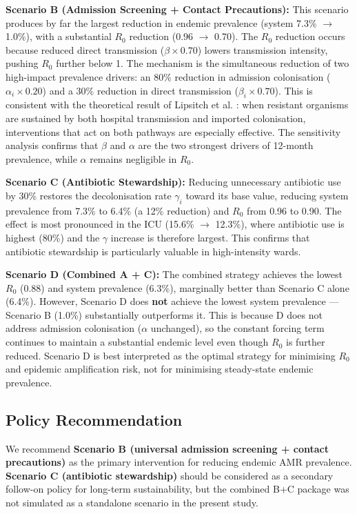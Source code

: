 \documentclass[12pt,a4paper]{article}
\begin{document}
\textbf{Scenario B (Admission Screening + Contact Precautions):} This scenario produces by far the largest reduction in endemic prevalence (system 7.3\% $\to$ 1.0\%), with a substantial $R_0$ reduction (0.96 $\to$ 0.70). The $R_0$ reduction occurs because reduced direct transmission ($\beta \times 0.70$) lowers transmission intensity, pushing $R_0$ further below 1. The mechanism is the simultaneous reduction of two high-impact prevalence drivers: an 80\% reduction in admission colonisation ($\alpha_i \times 0.20$) and a 30\% reduction in direct transmission ($\beta_i \times 0.70$). This is consistent with the theoretical result of Lipsitch et al. \cite{lipsitch2000}: when resistant organisms are sustained by both hospital transmission and imported colonisation, interventions that act on both pathways are especially effective. The sensitivity analysis confirms that $\beta$ and $\alpha$ are the two strongest drivers of 12-month prevalence, while $\alpha$ remains negligible in $R_0$.

\textbf{Scenario C (Antibiotic Stewardship):} Reducing unnecessary antibiotic use by 30\% restores the decolonisation rate $\gamma_i$ toward its base value, reducing system prevalence from 7.3\% to 6.4\% (a 12\% reduction) and $R_0$ from 0.96 to 0.90. The effect is most pronounced in the ICU (15.6\% $\to$ 12.3\%), where antibiotic use is highest (80\%) and the $\gamma$ increase is therefore largest. This confirms that antibiotic stewardship is particularly valuable in high-intensity wards.

\textbf{Scenario D (Combined A + C):} The combined strategy achieves the lowest $R_0$ (0.88) and system prevalence (6.3\%), marginally better than Scenario C alone (6.4\%). However, Scenario D does \textbf{not} achieve the lowest system prevalence --- Scenario B (1.0\%) substantially outperforms it. This is because D does not address admission colonisation ($\alpha$ unchanged), so the constant forcing term continues to maintain a substantial endemic level even though $R_0$ is further reduced. Scenario D is best interpreted as the optimal strategy for minimising $R_0$ and epidemic amplification risk, not for minimising steady-state endemic prevalence.

\subsection{Policy Recommendation}

We recommend \textbf{Scenario B (universal admission screening + contact precautions)} as the primary intervention for reducing endemic AMR prevalence. \textbf{Scenario C (antibiotic stewardship)} should be considered as a secondary follow-on policy for long-term sustainability, but the combined B+C package was not simulated as a standalone scenario in the present study.
\end{document}
